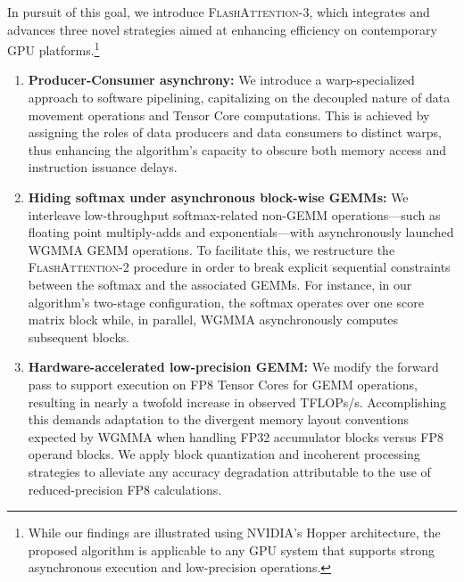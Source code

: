 In pursuit of this goal, we introduce \textsc{FlashAttention-3}, which integrates and advances three novel strategies aimed at enhancing efficiency on contemporary GPU platforms.\footnote{While our findings are illustrated using NVIDIA's Hopper architecture, the proposed algorithm is applicable to any GPU system that supports strong asynchronous execution and low-precision operations.}

\begin{enumerate}

\item \textbf{Producer-Consumer asynchrony:} We introduce a warp-specialized approach to software pipelining, capitalizing on the decoupled nature of data movement operations and Tensor Core computations. This is achieved by assigning the roles of data producers and data consumers to distinct warps, thus enhancing the algorithm’s capacity to obscure both memory access and instruction issuance delays.
\item \textbf{Hiding softmax under asynchronous block-wise GEMMs:} We interleave low-throughput softmax-related non-GEMM operations—such as floating point multiply-adds and exponentials—with asynchronously launched WGMMA GEMM operations. To facilitate this, we restructure the \textsc{FlashAttention-2} procedure in order to break explicit sequential constraints between the softmax and the associated GEMMs. For instance, in our algorithm’s two-stage configuration, the softmax operates over one score matrix block while, in parallel, WGMMA asynchronously computes subsequent blocks.
\item \textbf{Hardware-accelerated low-precision GEMM:} We modify the forward pass to support execution on FP8 Tensor Cores for GEMM operations, resulting in nearly a twofold increase in observed TFLOPs/s. Accomplishing this demands adaptation to the divergent memory layout conventions expected by WGMMA when handling FP32 accumulator blocks versus FP8 operand blocks. We apply block quantization and incoherent processing strategies to alleviate any accuracy degradation attributable to the use of reduced-precision FP8 calculations.


\end{enumerate}
